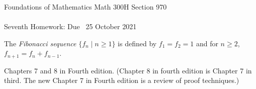 \documentclass[12pt]{article}
\newcommand{\demph}[1]{{\color{blue}\sl{#1}}}
\begin{document}
\LARGE 
\noindent
{\color{Maroon}Foundations of Mathematics \hfill Math 300H Section 970}\vspace{2pt}\\
\Large \vspace{2pt}\\
\large
Seventh Homework: \hfill Due \  25 October 2021
\normalsize\medskip


\noindent{\color{blue}\rule{528.3675pt}{2pt}}


The \demph{Fibonacci sequence} $\{f_n\mid n\geq 1\}$ is defined by $f_1=f_2=1$ and for $n\geq 2$, $f_{n+1}=f_{n}+f_{n-1}$.

   Chapters 7 and 8 in Fourth edition.
(Chapter 8 in fourth edition is Chapter 7 in third.  The new Chapter 7 in Fourth edition is a review of proof techniques.)


\noindent{\color{blue}\rule{528.3675pt}{2pt}}
\end{document}
